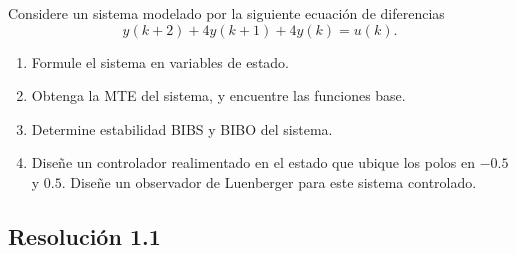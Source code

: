 \documentclass[
  11pt,
  letterpaper,
   addpoints,
  answers
  ]{exam}
\begin{document}
\begin{questions}
  \question Considere un sistema modelado por la siguiente ecuación de diferencias
\begin{equation}
y(k+2) + 4y(k+1) + 4y(k) = u(k).
\end{equation}

\begin{enumerate}
    \item Formule el sistema en variables de estado.
    \item Obtenga la MTE del sistema, y encuentre las funciones base.
    \item Determine estabilidad BIBS y BIBO del sistema.
    \item Diseñe un controlador realimentado en el estado que ubique los polos en $-0.5$ y $0.5$. Diseñe un observador de Luenberger para este sistema controlado.
\end{enumerate}
\begin{solution}

\subsection*{Resolución 1.1}


\end{solution}
\end{questions}
\end{document}
